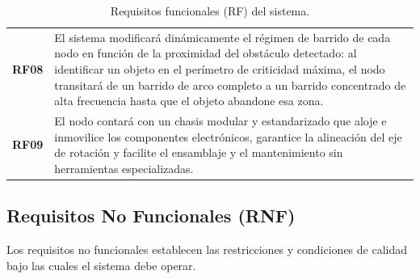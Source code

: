 \begin{table}[H]
{\begin{tabular}{p{2cm} p{14cm}}
        \addlinespace
        \textbf{RF08} & El sistema modificará dinámicamente el régimen de barrido de cada nodo en función de la proximidad del obstáculo detectado: al identificar un objeto en el perímetro de criticidad máxima, el nodo transitará de un barrido de arco completo a un barrido concentrado de alta frecuencia hasta que el objeto abandone esa zona. \\
        \addlinespace
        \textbf{RF09} & El nodo contará con un chasis modular y estandarizado que aloje e inmovilice los componentes electrónicos, garantice la alineación del eje de rotación y facilite el ensamblaje y el mantenimiento sin herramientas especializadas. \\
        \bottomrule
    \end{tabular}
}
\caption{Requisitos funcionales (RF) del sistema.}
\label{tab:rf}
\end{table}

\subsection{Requisitos No Funcionales (RNF)}

Los requisitos no funcionales establecen las restricciones y condiciones de calidad bajo las cuales el sistema debe operar.

